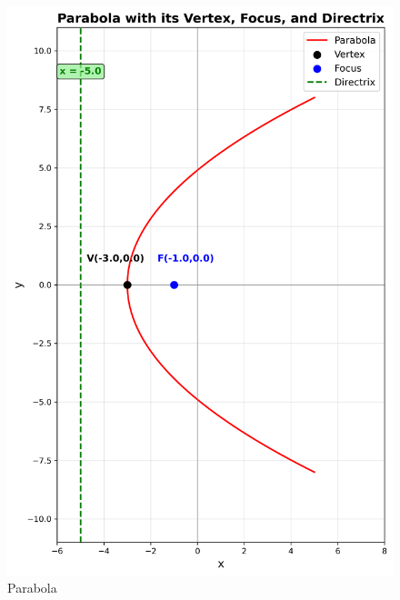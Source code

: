 \documentclass[journal]{IEEEtran}
\begin{document}
\begin{figure}
    \centering
    \includegraphics[width=\columnwidth]{figs/fig2.png}
    \caption{Parabola}
    \label{fig:figs/fig2.png}
\end{figure}
\end{document}

